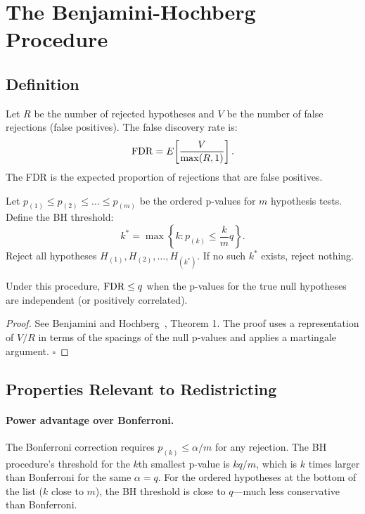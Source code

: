 \section{The Benjamini-Hochberg Procedure}
\label{sec:bh}

\subsection{Definition}

\begin{definition}
Let $R$ be the number of rejected hypotheses and $V$ be the number of
false rejections (false positives).
The false discovery rate is:
\[
  \mathrm{FDR} = E\!\left[\frac{V}{\max(R, 1)}\right].
\]
The FDR is the expected proportion of rejections that are false positives.
\end{definition}

\begin{theorem}
\label{thm:bh}
Let $p_{(1)} \leq p_{(2)} \leq \ldots \leq p_{(m)}$ be the ordered
p-values for $m$ hypothesis tests.
Define the BH threshold:
\[
  k^* = \max\left\{ k : p_{(k)} \leq \frac{k}{m} q \right\}.
\]
Reject all hypotheses $H_{(1)}, H_{(2)}, \ldots, H_{(k^*)}$.
If no such $k^*$ exists, reject nothing.

Under this procedure, $\mathrm{FDR} \leq q$ when the p-values for
the true null hypotheses are independent (or positively correlated).
\end{theorem}

\begin{proof}
See Benjamini and Hochberg~\citep{bh1995}, Theorem 1.
The proof uses a representation of $V/R$ in terms of the spacings of
the null p-values and applies a martingale argument.
$\square$
\end{proof}

\subsection{Properties Relevant to Redistricting}

\paragraph{Power advantage over Bonferroni.}
The Bonferroni correction requires $p_{(k)} \leq \alpha/m$ for any
rejection.
The BH procedure's threshold for the $k$th smallest p-value is
$kq/m$, which is $k$ times larger than Bonferroni for the same $\alpha = q$.
For the ordered hypotheses at the bottom of the list ($k$ close to $m$),
the BH threshold is close to $q$---much less conservative than Bonferroni.

